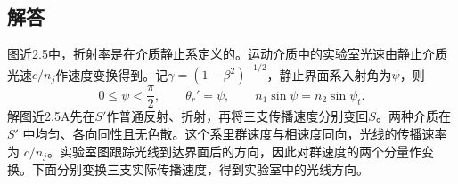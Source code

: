 \documentclass[UTF8,fontset=fandol,a4paper,11pt]{ctexart}
\begin{document}
\subsection*{解答}


图近2.5中，折射率是在介质静止系定义的。运动介质中的实验室光速由静止介质光速$c/n_j$作速度变换得到。记$\gamma=(1-\beta^2)^{-1/2}$，静止界面系入射角为$\psi$，则
\[
0\le\psi<\frac\pi2,\qquad
\theta_r'=\psi,\qquad n_1\sin\psi=n_2\sin\psi_t.
\]
解图近2.5A先在$S'$作普通反射、折射，再将三支传播速度分别变回$S$。两种介质在 $S'$ 中均匀、各向同性且无色散。这个系里群速度与相速度同向，光线的传播速率为 $c/n_j$。实验室图跟踪光线到达界面后的方向，因此对群速度的两个分量作变换。下面分别变换三支实际传播速度，得到实验室中的光线方向。

\begin{center}\begin{minipage}{.98\linewidth}\centering
\begin{tikzpicture}[scale=.85,transform shape]

\end{tikzpicture}
\end{minipage}
\end{center}
\end{document}
